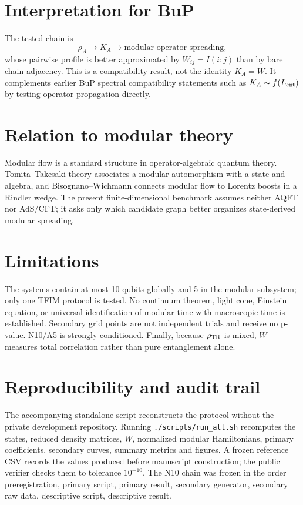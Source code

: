 \documentclass[11pt,a4paper]{article}
\begin{document}
\section{Interpretation for BuP}
The tested chain is
\[
\rho_A\to K_A\to\text{modular operator spreading},
\]
whose pairwise profile is better approximated by $W_{ij}=I(i:j)$ than by bare chain adjacency. This is a compatibility result, not the identity $K_A=W$. It complements earlier BuP spectral compatibility statements such as $K_A\sim f(L_{\rm ent})$ by testing operator propagation directly.
\section{Relation to modular theory}
Modular flow is a standard structure in operator-algebraic quantum theory. Tomita--Takesaki theory associates a modular automorphism with a state and algebra, and Bisognano--Wichmann connects modular flow to Lorentz boosts in a Rindler wedge. The present finite-dimensional benchmark assumes neither AQFT nor AdS/CFT; it asks only which candidate graph better organizes state-derived modular spreading.
\section{Limitations}
The systems contain at most 10 qubits globally and 5 in the modular subsystem; only one TFIM protocol is tested. No continuum theorem, light cone, Einstein equation, or universal identification of modular time with macroscopic time is established. Secondary grid points are not independent trials and receive no p-value. N10/A5 is strongly conditioned. Finally, because $\rho_{\rm TR}$ is mixed, $W$ measures total correlation rather than pure entanglement alone.
\section{Reproducibility and audit trail}
The accompanying standalone script reconstructs the protocol without the private development repository. Running \texttt{./scripts/run\_all.sh} recomputes the states, reduced density matrices, $W$, normalized modular Hamiltonians, primary coefficients, secondary curves, summary metrics and figures. A frozen reference CSV records the values produced before manuscript construction; the public verifier checks them to tolerance $10^{-10}$. The N10 chain was frozen in the order preregistration, primary script, primary result, secondary generator, secondary raw data, descriptive script, descriptive result.
\end{document}
